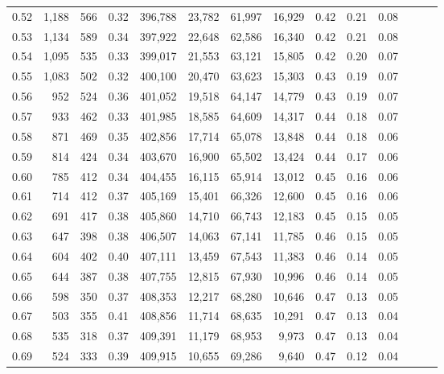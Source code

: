 \begin{tabular}{rrrrrrrrrrrrrr}
0.52 &   1,188 &    566 &  0.32 &  396,788 &   23,782 &  61,997 &  16,929 &  0.42 &  0.21 &      0.08 \\
0.53 &   1,134 &    589 &  0.34 &  397,922 &   22,648 &  62,586 &  16,340 &  0.42 &  0.21 &      0.08 \\
0.54 &   1,095 &    535 &  0.33 &  399,017 &   21,553 &  63,121 &  15,805 &  0.42 &  0.20 &      0.07 \\
0.55 &   1,083 &    502 &  0.32 &  400,100 &   20,470 &  63,623 &  15,303 &  0.43 &  0.19 &      0.07 \\
0.56 &     952 &    524 &  0.36 &  401,052 &   19,518 &  64,147 &  14,779 &  0.43 &  0.19 &      0.07 \\
0.57 &     933 &    462 &  0.33 &  401,985 &   18,585 &  64,609 &  14,317 &  0.44 &  0.18 &      0.07 \\
0.58 &     871 &    469 &  0.35 &  402,856 &   17,714 &  65,078 &  13,848 &  0.44 &  0.18 &      0.06 \\
0.59 &     814 &    424 &  0.34 &  403,670 &   16,900 &  65,502 &  13,424 &  0.44 &  0.17 &      0.06 \\
0.60 &     785 &    412 &  0.34 &  404,455 &   16,115 &  65,914 &  13,012 &  0.45 &  0.16 &      0.06 \\
0.61 &     714 &    412 &  0.37 &  405,169 &   15,401 &  66,326 &  12,600 &  0.45 &  0.16 &      0.06 \\
0.62 &     691 &    417 &  0.38 &  405,860 &   14,710 &  66,743 &  12,183 &  0.45 &  0.15 &      0.05 \\
0.63 &     647 &    398 &  0.38 &  406,507 &   14,063 &  67,141 &  11,785 &  0.46 &  0.15 &      0.05 \\
0.64 &     604 &    402 &  0.40 &  407,111 &   13,459 &  67,543 &  11,383 &  0.46 &  0.14 &      0.05 \\
0.65 &     644 &    387 &  0.38 &  407,755 &   12,815 &  67,930 &  10,996 &  0.46 &  0.14 &      0.05 \\
0.66 &     598 &    350 &  0.37 &  408,353 &   12,217 &  68,280 &  10,646 &  0.47 &  0.13 &      0.05 \\
0.67 &     503 &    355 &  0.41 &  408,856 &   11,714 &  68,635 &  10,291 &  0.47 &  0.13 &      0.04 \\
0.68 &     535 &    318 &  0.37 &  409,391 &   11,179 &  68,953 &   9,973 &  0.47 &  0.13 &      0.04 \\
0.69 &     524 &    333 &  0.39 &  409,915 &   10,655 &  69,286 &   9,640 &  0.47 &  0.12 &      0.04 \\

\end{tabular}
